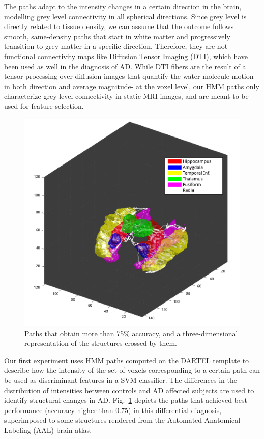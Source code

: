 The paths adapt to the intensity changes in a certain direction in the brain, modelling grey level connectivity in all spherical directions. Since grey level is directly related to tissue density, we can assume that the outcome follows smooth, same-density paths that start in white matter and progressively transition to grey matter in a specific direction. Therefore, they are not functional connectivity maps like Diffusion Tensor Imaging (DTI), which have been used as well in the diagnosis of AD\cite{Grana2011,Medina2008}. While DTI fibers are the result of a tensor processing over diffusion images that quantify the water molecule motion -in both direction and average magnitude- at the voxel level, our \ac{HMM} paths only characterize grey level connectivity in static MRI images, and are meant to be used for feature selection. 

\begin{figure}
	\begin{center}
		\includegraphics[width=\columnwidth]{gfx/ch6/radia&structures}
		\caption{Paths that obtain more than 75\% accuracy, and a three-dimensional representation of the structures crossed by them.}
		\label{fig:bestPaths}
	\end{center}
\end{figure}

Our first experiment uses \ac{HMM} paths computed on the DARTEL template to describe how the intensity of the set of voxels corresponding to a certain path can be used as discriminant features in a SVM classifier. The differences in the distribution of intensities between controls and AD affected subjects are used to identify structural changes in AD. Fig.~\ref{fig:bestPaths} depicts the paths that achieved best performance (accuracy higher than $0.75$) in this differential diagnosis, superimposed to some structures rendered from the Automated Anatomical Labeling (AAL) brain atlas\cite{Tzourio-Mazoyer2002}.

